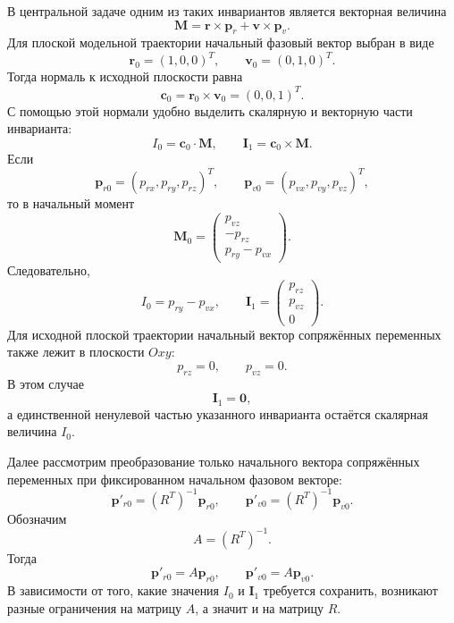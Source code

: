 В центральной задаче одним из таких инвариантов является векторная величина
\begin{equation}
\mathbf M
=
\mathbf r\times \mathbf p_r
+
\mathbf v\times \mathbf p_v .
\end{equation}
Для плоской модельной траектории начальный фазовый вектор выбран в виде
\begin{equation}
\mathbf r_0=(1,0,0)^T,\qquad
\mathbf v_0=(0,1,0)^T .
\end{equation}
Тогда нормаль к исходной плоскости равна
\begin{equation}
\mathbf c_0=\mathbf r_0\times\mathbf v_0=(0,0,1)^T .
\end{equation}
С помощью этой нормали удобно выделить скалярную и векторную части инварианта:
\begin{equation}
I_0=\mathbf c_0\cdot\mathbf M,
\qquad
\mathbf I_1=\mathbf c_0\times\mathbf M .
\end{equation}
Если
\begin{equation}
\mathbf p_{r0}=(p_{rx},p_{ry},p_{rz})^T,
\qquad
\mathbf p_{v0}=(p_{vx},p_{vy},p_{vz})^T,
\end{equation}
то в начальный момент
\begin{equation}
\mathbf M_0
=
\begin{pmatrix}
	p_{vz}\\
	-p_{rz}\\
	p_{ry}-p_{vx}
\end{pmatrix}.
\end{equation}
Следовательно,
\begin{equation}
I_0=p_{ry}-p_{vx},
\qquad
\mathbf I_1=
\begin{pmatrix}
	p_{rz}\\
	p_{vz}\\
	0
\end{pmatrix}.
\end{equation}
Для исходной плоской траектории начальный вектор сопряжённых переменных также лежит в плоскости \(Oxy\):
\begin{equation}
p_{rz}=0,\qquad p_{vz}=0.
\end{equation}
В этом случае
\begin{equation}
\mathbf I_1=\mathbf 0,
\end{equation}
а единственной ненулевой частью указанного инварианта остаётся скалярная величина \(I_0\).

Далее рассмотрим преобразование только начального вектора сопряжённых переменных при фиксированном начальном фазовом векторе:
\begin{equation}
\mathbf p'_{r0}=(R^T)^{-1}\mathbf p_{r0},
\qquad
\mathbf p'_{v0}=(R^T)^{-1}\mathbf p_{v0}.
\end{equation}
Обозначим
\begin{equation}
A=(R^T)^{-1}.
\end{equation}
Тогда
\begin{equation}
\mathbf p'_{r0}=A\mathbf p_{r0},
\qquad
\mathbf p'_{v0}=A\mathbf p_{v0}.
\end{equation}
В зависимости от того, какие значения \(I_0\) и \(\mathbf I_1\) требуется сохранить, возникают разные ограничения на матрицу \(A\), а значит и на матрицу \(R\).

